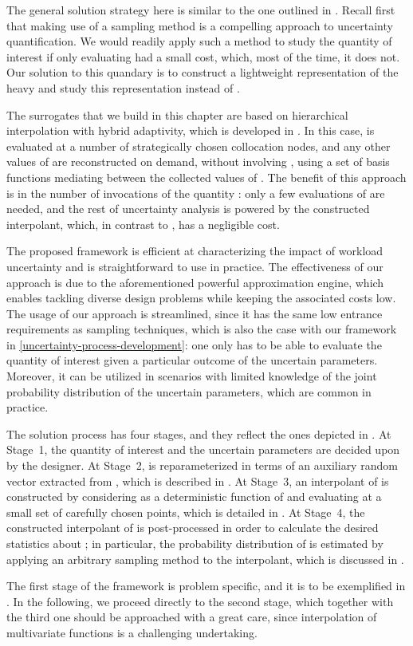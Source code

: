 The general solution strategy here is similar to the one outlined in
. Recall first that making use of a sampling method is a
compelling approach to uncertainty quantification. We would readily apply such a
method to study the quantity of interest \g if only evaluating \g had a small
cost, which, most of the time, it does not. Our solution to this quandary is to
construct a lightweight representation of the heavy \g and study this
representation instead of \g.

The surrogates that we build in this chapter are based on hierarchical
interpolation with hybrid adaptivity, which is developed in \cite{klimke2006,
ma2009, jakeman2012}. In this case, \g is evaluated at a number of strategically
chosen collocation nodes, and any other values of \g are reconstructed on
demand, without involving \g, using a set of basis functions mediating between
the collected values of \g. The benefit of this approach is in the number of
invocations of the quantity \g: only a few evaluations of \g are needed, and the
rest of uncertainty analysis is powered by the constructed interpolant, which,
in contrast to \g, has a negligible cost.

The proposed framework is efficient at characterizing the impact of workload
uncertainty and is straightforward to use in practice. The effectiveness of our
approach is due to the aforementioned powerful approximation engine, which
enables tackling diverse design problems while keeping the associated costs low.
The usage of our approach is streamlined, since it has the same low entrance
requirements as sampling techniques, which is also the case with our framework
in \cref{uncertainty-process-development}: one only has to be able to evaluate
the quantity of interest given a particular outcome of the uncertain parameters.
Moreover, it can be utilized in scenarios with limited knowledge of the joint
probability distribution of the uncertain parameters, which are common in
practice.

The solution process has four stages, and they reflect the ones depicted in
. At Stage~1, the quantity of interest \g and the uncertain
parameters \vu are decided upon by the designer. At Stage~2, \g is
reparameterized in terms of an auxiliary random vector \vz extracted from \vu,
which is described in . At Stage~3, an interpolant of
\g is constructed by considering \g as a deterministic function of \vz and
evaluating \g at a small set of carefully chosen points, which is detailed in
. At Stage~4, the constructed interpolant of \g is
post-processed in order to calculate the desired statistics about \g; in
particular, the probability distribution of \g is estimated by applying an
arbitrary sampling method to the interpolant, which is discussed in
.

The first stage of the framework is problem specific, and it is to be
exemplified in . In the following, we proceed directly
to the second stage, which together with the third one should be approached with
a great care, since interpolation of multivariate functions is a challenging
undertaking.
